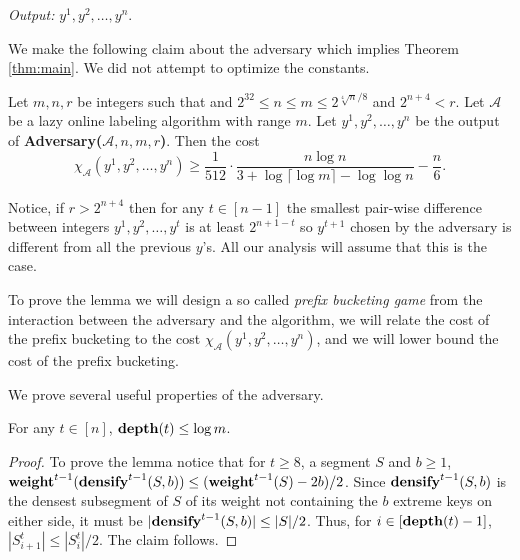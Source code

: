 \documentclass[runningheads,a4paper]{llncs}
\newcommand{\A}{\mathcal{A}}
\newcommand{\weight}{{\rm {\bf weight}}}
\newcommand{\depth}{{\rm {\bf depth}}}
\newcommand{\densify}{{\rm {\bf densify}}}
\begin{document}
\smallskip\noindent\emph{Output:} $y^1,y^2,\dots,y^n$.

\medskip
We make the following claim about the adversary which implies Theorem \ref{thm:main}. We did not attempt to optimize
the constants.

\begin{lemma}\label{l-main}
Let $m,n,r$ be integers such that and $2^{32} \le n \le m \le 2^{\sqrt[4]{n}/8}$ and $2^{n+4}<r$. 
Let $\A$ be a lazy online labeling algorithm with range $m$. 
Let $y^1,y^2,\dots,y^n$ be the output of {\bf Adversary($\A,n,m,r$)}. 
Then the cost $$\chi_\A(y^1,y^2,\dots,y^n) \ge \frac{1}{512} \cdot \frac{n \log n}{ 3 + \log \lceil \log m \rceil - \log \log n} - \frac{n}{6}.$$
\end{lemma}

%

Notice, if $r>2^{n+4}$ then for any $t\in[n-1]$ the smallest pair-wise difference between integers $y^1,y^2,\dots,y^t$ is
at least $2^{n+1-t}$ so $y^{t+1}$ chosen by the adversary is different from all the previous $y$'s. All our analysis will assume
that this is the case.
 
To prove the lemma we will design a so called \emph{prefix bucketing game} from the interaction between the
adversary and the algorithm, we will relate the cost of the prefix bucketing to the cost $\chi_\A(y^1,y^2,\dots,y^n)$,
and we will lower bound the cost of the prefix bucketing.

We prove several useful properties of the adversary.
 
\begin{lemma}
For any $t\in [n]$, $\depth(t)\le \log m$.
\end{lemma}

\begin{proof}
To prove the lemma notice that for $t\ge 8$, a segment $S$ and 
$b\ge 1$, $\weight^{t-1}(\densify^{t-1}(S,b)) \le (\weight^{t-1}(S)-2b)/2$. Since $\densify^{t-1}(S,b)$
is the densest subsegment of $S$ of its weight not containing the $b$ extreme keys on 
either side, it must be $|\densify^{t-1}(S,b)| \le |S|/2$.
Thus, for $i\in[\depth(t)-1]$, $|S^t_{i+1}| \le |S^t_{i}|/2$. The claim follows.
\end{proof}
\end{document}
